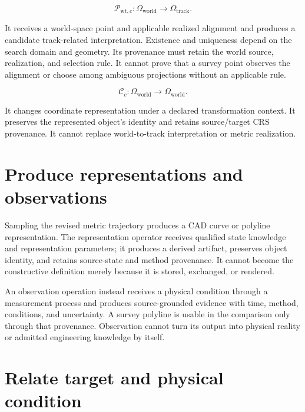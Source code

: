 \begin{definition}
\label{def:world-to-track-operator}
\[
\mathcal P_{\mathrm{wt},c}:
\Omega_{\mathrm{world}}\rightarrow\Omega_{\mathrm{track}}.
\]
\end{definition}

It receives a world-space point and applicable realized alignment and
produces a candidate track-related interpretation. Existence and
uniqueness depend on the search domain and geometry. Its provenance must
retain the world source, realization, and selection rule. It cannot prove
that a survey point observes the alignment or choose among ambiguous
projections without an applicable rule.

\begin{definition}
\label{def:coordinate-transform-operator}
\[
\mathcal C_c:
\Omega_{\mathrm{world}}\rightarrow\Omega_{\mathrm{world}}.
\]
\end{definition}

It changes coordinate representation under a declared transformation
context. It preserves the represented object's identity and retains
source/target CRS provenance. It cannot replace world-to-track
interpretation or metric realization.

\section{Produce representations and observations}

Sampling the revised metric trajectory produces a CAD curve or polyline
representation. The representation operator receives qualified state
knowledge and representation parameters; it produces a derived artifact,
preserves object identity, and retains source-state and method provenance.
It cannot become the constructive definition merely because it is
stored, exchanged, or rendered.

An observation operation instead receives a physical condition through
a measurement process and produces source-grounded evidence with time,
method, conditions, and uncertainty. A survey polyline is usable in the
comparison only through that provenance. Observation cannot turn its
output into physical reality or admitted engineering knowledge by
itself.

\section{Relate target and physical condition}

